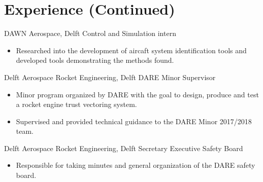\documentclass{tccv}
\begin{document}


\newpage
\onecolumn
\section{Experience (Continued)}
\begin{eventlist}

    {DAWN Aerospace, Delft}
    {Control and Simulation intern}
\begin{itemize}
   \item{Researched into the development of aircaft system identification tools and developed tools demonstrating the methods found.}
\end{itemize}

    {Delft Aerospace Rocket Engineering, Delft}
    {DARE Minor Supervisor}
\begin{itemize}
   \item Minor program organized by DARE with the goal to design, produce and test a rocket engine trust vectoring system.
   \item Supervised and provided technical guidance to the DARE Minor 2017/2018 team.
\end{itemize}

     {Delft Aerospace Rocket Engineering, Delft}
     {Secretary Executive Safety Board}
\begin{itemize}
    \item Responsible for taking minutes and general organization of the DARE safety board.
\end{itemize}


\end{eventlist}
\end{document}
